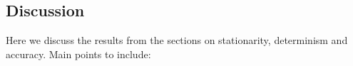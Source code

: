 

\subsection{Discussion}
\label{sec:stationarity_discussion}

Here we discuss the results from the sections on stationarity, determinism and accuracy. Main points to include:

